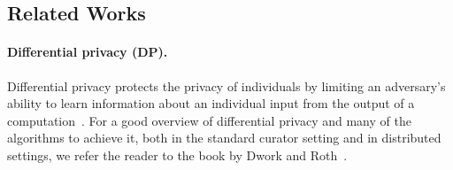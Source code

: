 \subsection{Related Works}
\paragraph{Differential privacy (DP).} Differential privacy protects the privacy of individuals by limiting an adversary's ability to learn information about an individual input from the output of a computation~\cite{dwork2006differential,dwork2006calibrating}. 
For a good overview of differential privacy and many of the algorithms to achieve it, both in the standard curator setting and in distributed settings, we refer the reader to the book by Dwork and Roth~\cite{dwork2014algorithmic}.

